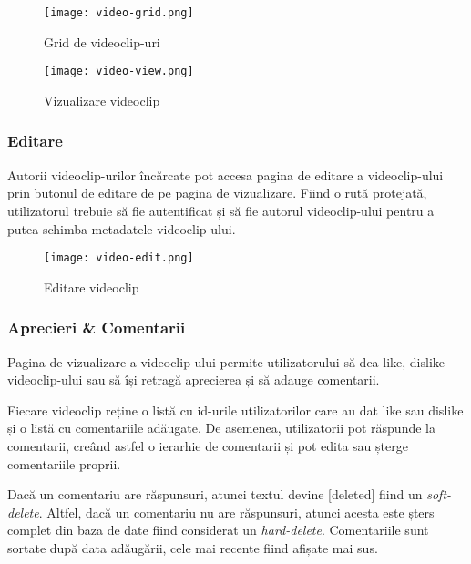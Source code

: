 \begin{figure}[h] 
    \centering
    \begin{minipage}{0.49\textwidth}
        \centering
        \texttt{[image: video-grid.png]}
        \caption{Grid de videoclip-uri}
        \label{fig:video-grid}
    \end{minipage}\hfill
    \begin{minipage}{0.49\textwidth}
        \centering
        \texttt{[image: video-view.png]}
        \caption{Vizualizare videoclip}
        \label{fig:video-view}
    \end{minipage}
\end{figure}

\subsubsection{Editare}
Autorii videoclip-urilor încărcate pot accesa pagina de editare a videoclip-ului prin butonul
de editare de pe pagina de vizualizare. Fiind o rută protejată, utilizatorul trebuie să fie
autentificat și să fie autorul videoclip-ului pentru a putea schimba metadatele videoclip-ului.

\begin{figure}[h]
    \centering
    \texttt{[image: video-edit.png]}
    \caption{Editare videoclip}
    \label{fig:video-edit}
\end{figure}

\subsubsection{Aprecieri \& Comentarii}
Pagina de vizualizare a videoclip-ului permite utilizatorului să dea like, dislike videoclip-ului
sau să își retragă aprecierea și să adauge comentarii. 
\par
Fiecare videoclip reține o listă cu id-urile utilizatorilor care au dat like sau dislike și o
listă cu comentariile adăugate. De asemenea, utilizatorii pot răspunde la comentarii, creând astfel
o ierarhie de comentarii și pot edita sau șterge comentariile proprii.
\par
Dacă un comentariu are răspunsuri, atunci textul devine [deleted] fiind un \textit{soft-delete}.
Altfel, dacă un comentariu nu are răspunsuri, atunci acesta este șters complet din baza de date
fiind considerat un \textit{hard-delete}. Comentariile sunt sortate după data adăugării, cele mai
recente fiind afișate mai sus. 

